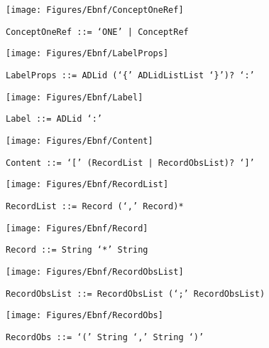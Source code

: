  \begin{figure}[H]
  \centering
  \texttt{[image: Figures/Ebnf/ConceptOneRef]}
  \caption*{\texttt{ConceptOneRef \small::=  `ONE' | ConceptRef}}
  \label{fig:ebnf-ConceptOneRef}
 \end{figure}

 \begin{figure}[H]
  \centering
  \texttt{[image: Figures/Ebnf/LabelProps]}
  \caption*{\texttt{LabelProps \small::=  ADLid (`\{' ADLidListList `\}')? `:'}}
  \label{fig:ebnf-LabelProps}
 \end{figure}

 \begin{figure}[H]
  \centering
  \texttt{[image: Figures/Ebnf/Label]}
  \caption*{\texttt{Label \small::=  ADLid `:'}}
  \label{fig:ebnf-Label}
 \end{figure}

 \begin{figure}[H]
  \centering
  \texttt{[image: Figures/Ebnf/Content]}
  \caption*{\texttt{Content \small::=  `[' (RecordList | RecordObsList)? `]'}}
  \label{fig:ebnf-Content}
 \end{figure}

 \begin{figure}[H]
  \centering
  \texttt{[image: Figures/Ebnf/RecordList]}
  \caption*{\texttt{RecordList \small::=  Record (`,' Record)*}}
  \label{fig:ebnf-RecordList}
 \end{figure}

 \begin{figure}[H]
  \centering
  \texttt{[image: Figures/Ebnf/Record]}
  \caption*{\texttt{Record \small::=  String `*' String}}
  \label{fig:ebnf-Record}
 \end{figure}

 \begin{figure}[H]
  \centering
  \texttt{[image: Figures/Ebnf/RecordObsList]}
  \caption*{\texttt{RecordObsList \small::=  RecordObsList (`;' RecordObsList)}}
  \label{fig:ebnf-RecordObsList}
 \end{figure}

 \begin{figure}[H]
  \centering
  \texttt{[image: Figures/Ebnf/RecordObs]}
  \caption*{\texttt{RecordObs \small::=  `(' String `,' String `)'}}
  \label{fig:ebnf-RecordObs}
 \end{figure}

